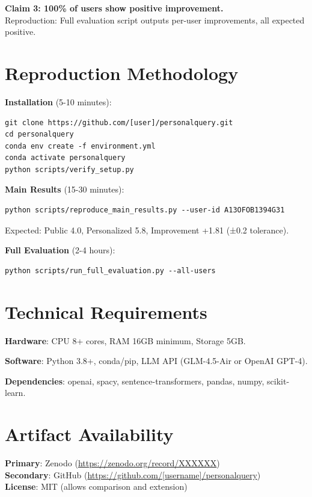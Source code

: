 \documentclass[11pt]{article}
\begin{document}
\textbf{Claim 3: 100\% of users show positive improvement.}\\
Reproduction: Full evaluation script outputs per-user improvements, all expected positive.

\section{Reproduction Methodology}

\textbf{Installation} (5-10 minutes):
\begin{verbatim}
git clone https://github.com/[user]/personalquery.git
cd personalquery
conda env create -f environment.yml
conda activate personalquery
python scripts/verify_setup.py
\end{verbatim}

\textbf{Main Results} (15-30 minutes):
\begin{verbatim}
python scripts/reproduce_main_results.py --user-id A13OFOB1394G31
\end{verbatim}
Expected: Public 4.0, Personalized 5.8, Improvement +1.81 (±0.2 tolerance).

\textbf{Full Evaluation} (2-4 hours):
\begin{verbatim}
python scripts/run_full_evaluation.py --all-users
\end{verbatim}

\section{Technical Requirements}

\textbf{Hardware}: CPU 8+ cores, RAM 16GB minimum, Storage 5GB.

\textbf{Software}: Python 3.8+, conda/pip, LLM API (GLM-4.5-Air or OpenAI GPT-4).

\textbf{Dependencies}: openai, spacy, sentence-transformers, pandas, numpy, scikit-learn.

\section{Artifact Availability}

\textbf{Primary}: Zenodo (\url{https://zenodo.org/record/XXXXXX})\\
\textbf{Secondary}: GitHub (\url{https://github.com/[username]/personalquery})\\
\textbf{License}: MIT (allows comparison and extension)



\end{document}
